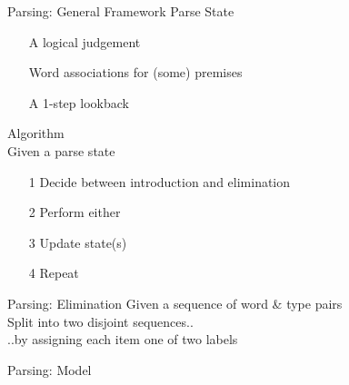 \documentclass{beamer}
\begin{document}
\begin{frame}{Parsing: General Framework}
	\alert{Parse State}
		\begin{itemize}
			\item[] A logical judgement
			\item[] Word associations for (some) premises
			\item[] A 1-step lookback
		\end{itemize}
		
	\alert{Algorithm}\\
	Given a parse state
	\begin{itemize}
		\item[1] Decide between introduction and elimination
		\item[2] Perform either
		\item[3] Update state(s)
		\item[4] Repeat
	\end{itemize}
\end{frame}

\begin{frame}{Parsing: Elimination}
	Given a sequence of word \& type pairs \\ 
	\quad Split into two disjoint sequences.. \\
	\pause
	\quad ..by assigning each item one of two labels
\end{frame}

\begin{frame}{Parsing: Model}
	\begin{figure}
	\end{figure}
\end{frame}
\end{document}
